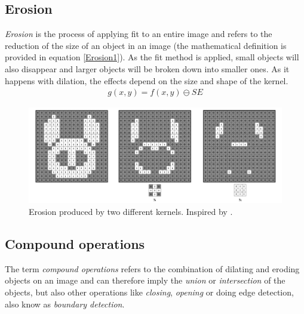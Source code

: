 \subsection{Erosion}
\textit{Erosion} is the process of applying fit to an entire image and refers to the reduction of the size of an object in an image (the mathematical definition is provided in equation \ref{Erosion1}). As the fit method is applied, small objects will also disappear and larger objects will be broken down into smaller ones. As it happens with dilation, the effects depend on the size and shape of the kernel.
\begin{equation}
\begin{aligned}
{g(x, y)}={f(x,y)}\ominus{SE}
\label{Erosion1}
	\end{aligned}
\end{equation}

\begin{figure}[htbp]
\centering
\includegraphics[width=1\textwidth]{Pictures/Theory/Erosion.png}
\caption{Erosion produced by two different kernels. Inspired by \citep{ip_book}.}
\label{fig:Erosion}
\end{figure}

\subsection{Compound operations} \label{compound}
The term \textit{compound operations} refers to the combination of dilating and eroding objects on an image and can therefore imply the \textit{union} or \textit{intersection} of the objects, but also other operations like \textit{closing}, \textit{opening} or doing edge detection, also know as \textit{boundary detection}.

